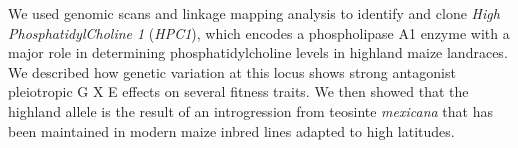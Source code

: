 \documentclass[9pt,twocolumn,twoside,lineno]{biorxiv}
\begin{document}
We used genomic scans and linkage mapping analysis to identify and clone \textit{High PhosphatidylCholine 1} (\textit{HPC1}), which encodes a phospholipase A1 enzyme with a major role in determining phosphatidylcholine levels in highland maize landraces.
We described how genetic variation at this locus shows strong antagonist pleiotropic G X E effects on several fitness traits.
We then showed that the highland allele is the result of an introgression from teosinte \textit{mexicana} that has been maintained in modern maize inbred lines adapted to high latitudes.
\end{document}
